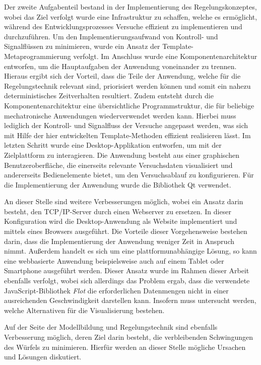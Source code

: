 Der zweite Aufgabenteil bestand in der Implementierung des Regelungskonzeptes, wobei das Ziel verfolgt wurde eine Infrastruktur zu schaffen, welche es ermöglicht, während des Entwicklungsprozesses Versuche effizient zu implementieren und durchzuführen. Um den Implementierungsaufwand von Kontroll- und Signalflüssen zu minimieren, wurde ein Ansatz der Template-Metaprogrammierung verfolgt. Im Anschluss wurde eine Komponentenarchitektur entworfen, um die Hauptaufgaben der Anwendung voneinander zu trennen. Hieraus ergibt sich der Vorteil, dass die Teile der Anwendung, welche für die Regelungstechnik relevant sind, priorisiert werden können und somit ein nahezu deterministisches Zeitverhalten resultiert. Zudem entsteht durch die Komponentenarchitektur eine übersichtliche Programmstruktur, die für beliebige mechatronische Anwendungen wiederverwendet werden kann. Hierbei muss lediglich der Kontroll- und Signalfluss der Versuche angepasst werden, was sich mit Hilfe der hier entwickelten Template-Methoden effizient realisieren lässt. Im letzten Schritt wurde eine Desktop-Applikation entworfen, um mit der Zielplattform zu interagieren. Die Anwendung besteht aus einer graphischen Benutzeroberfläche, die einerseits relevante Versuchsdaten visualisiert und andererseits Bedienelemente bietet, um den Versuchsablauf zu konfigurieren. Für die Implementierung der Anwendung wurde die Bibliothek Qt verwendet.

An dieser Stelle sind weitere Verbesserungen möglich, wobei ein Ansatz darin besteht, den TCP/IP-Server durch einen Webserver zu ersetzen. In dieser Konfiguration wird die Desktop-Anwendung als Website implementiert und mittels eines Browsers ausgeführt. Die Vorteile dieser Vorgehensweise bestehen darin, dass die Implementierung der Anwendung weniger Zeit in Anspruch nimmt. Außerdem handelt es sich um eine plattformunabhängige Lösung, so kann eine webbasierte Anwendung beispielsweise auch auf einem Tablet oder Smartphone ausgeführt werden. Dieser  Ansatz wurde im Rahmen dieser Arbeit ebenfalls verfolgt, wobei sich allerdings das Problem ergab, dass die verwendete JavaScript-Bibliothek \textit{Flot} die erforderlichen Datenmengen nicht in einer ausreichenden Geschwindigkeit darstellen kann. Insofern muss untersucht werden, welche Alternativen für die Visualisierung bestehen.

Auf der Seite der Modellbildung und Regelungstechnik sind ebenfalls Verbesserung möglich, deren Ziel darin besteht, die verbleibenden Schwingungen des Würfels zu minimieren. Hierfür werden an dieser Stelle mögliche Ursachen und Lösungen diskutiert.

